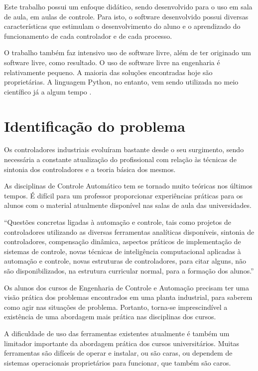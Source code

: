     Este trabalho possui um enfoque didático, sendo desenvolvido para o uso em sala de aula,
    em aulas de controle. Para isto, o software desenvolvido possui diversas características
    que estimulam o desenvolvimento do aluno e o aprendizado do funcionamento de cada controlador e 
    de cada processo.

    O trabalho também faz intensivo uso de software livre, além de ter originado um software
    livre, como resultado. O uso de software livre na engenharia é relativamente pequeno.
    A maioria das soluções encontradas hoje são proprietárias. A linguagem Python, no entanto,
    vem sendo utilizada no meio científico já a algum tempo \cite{5725235}.


\section{Identificação do problema}
    
    Os controladores industriais evoluíram bastante desde o seu surgimento, sendo necessária
    a constante atualização do profissional com relação às técnicas de sintonia dos
    controladores e a teoria básica dos mesmos.

    As disciplinas de Controle Automático tem se tornado muito teóricas nos últimos
    tempos. É difícil para um professor proporcionar experiências práticas para os
    alunos com o material atualmente disponível nas salas de aula das universidades.
    
    ``Questões concretas ligadas à automação e controle, tais como projetos de
    controladores utilizando as diversas ferramentas analíticas disponíveis, sintonia de
    controladores, compensação dinâmica, aspectos práticos de implementação de sistemas de
    controle, novas técnicas de inteligência computacional aplicadas à automação e controle,
    novas estruturas de controladores, para citar alguns, não são disponibilizados, na estrutura
    curricular normal, para a formação dos alunos.'' \cite{cobenge}

    Os alunos dos cursos de Engenharia de Controle e Automação precisam ter uma
    visão prática dos problemas encontrados em uma planta industrial, para saberem
    como agir nas situações de problema. Portanto, torna-se imprescindível a existência
    de uma abordagem mais prática nas disciplinas dos cursos.

    A dificuldade de uso das ferramentas existentes atualmente é também um limitador
    importante da abordagem prática dos cursos universitários. Muitas ferramentas
    são difíceis de operar e instalar, ou são caras, ou dependem de sistemas operacionais
    proprietários para funcionar, que também são caros.

